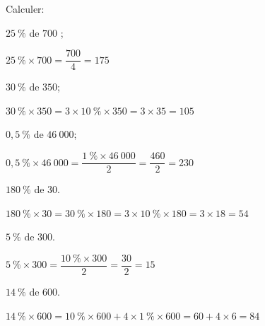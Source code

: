 \documentclass[11pt,a4paper]{article}  %
\begin{document}
Calculer:
	\begin{enumMet}
		\item $25\ \%$ de $700$ ;
		\begin{corrBox}
			$25\ \%\times 700=\dfrac{700}{4}=175$		
		\end{corrBox}
		\item {} $30\ \%$ de $350$;
		\begin{corrBox}
			$30\ \%\times 350=3\times 10\ \% \times 350=3\times 35=105$		
		\end{corrBox}
		\item $0,5\ \%$ de $46\ 000$;
		\begin{corrBox}
			$0,5\ \%\times 46\ 000=\dfrac{1\ \%\times 46\ 000}{2}=\dfrac{460}{2}=230$
		\end{corrBox}
		\item $180\ \%$ de $30$.
		\begin{corrBox}
			$180\ \%\times 30=30\ \%\times 180= 3\times 10\ \%\times 180=3\times 18=54$
		\end{corrBox}
		\item $5\ \%$ de $300$.
		\begin{corrBox}
			$5\ \%\times 300=\dfrac{10\ \%\times 300}{2}=\dfrac{30}{2}=15$
		\end{corrBox}
		\item $14\ \%$ de $600$.
		\begin{corrBox}
			$14\ \%\times 600=10\ \%\times 600+4\times 1\ \%\times 600=60+4\times 6=84$
		\end{corrBox}
	\end{enumMet}
\end{document}
